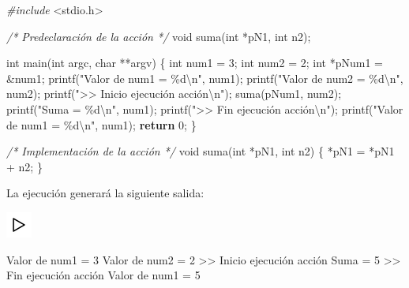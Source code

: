 \documentclass[
]{book}
\newenvironment{Shaded}{\begin{snugshade}}{\end{snugshade}}
\newcommand{\CommentTok}[1]{\textcolor[rgb]{0.56,0.35,0.01}{\textit{#1}}}
\newcommand{\ControlFlowTok}[1]{\textcolor[rgb]{0.13,0.29,0.53}{\textbf{#1}}}
\newcommand{\DataTypeTok}[1]{\textcolor[rgb]{0.13,0.29,0.53}{#1}}
\newcommand{\DecValTok}[1]{\textcolor[rgb]{0.00,0.00,0.81}{#1}}
\newcommand{\ImportTok}[1]{#1}
\newcommand{\NormalTok}[1]{#1}
\newcommand{\PreprocessorTok}[1]{\textcolor[rgb]{0.56,0.35,0.01}{\textit{#1}}}
\newcommand{\SpecialCharTok}[1]{\textcolor[rgb]{0.00,0.00,0.00}{#1}}
\newcommand{\StringTok}[1]{\textcolor[rgb]{0.31,0.60,0.02}{#1}}
\begin{document}
\begin{Shaded}
\begin{Highlighting}[]
\PreprocessorTok{\#include }\ImportTok{\textless{}stdio.h\textgreater{}}

\CommentTok{/* Predeclaración de la acción */}
\DataTypeTok{void}\NormalTok{ suma(}\DataTypeTok{int}\NormalTok{ *pN1, }\DataTypeTok{int}\NormalTok{ n2);}

\DataTypeTok{int}\NormalTok{ main(}\DataTypeTok{int}\NormalTok{ argc, }\DataTypeTok{char}\NormalTok{ **argv) \{}
    \DataTypeTok{int}\NormalTok{ num1 = }\DecValTok{3}\NormalTok{;}
    \DataTypeTok{int}\NormalTok{ num2 = }\DecValTok{2}\NormalTok{;}
    \DataTypeTok{int}\NormalTok{ *pNum1 = \&num1;}
\NormalTok{    printf(}\StringTok{"Valor de num1 = \%d}\SpecialCharTok{\textbackslash{}n}\StringTok{"}\NormalTok{, num1);}
\NormalTok{    printf(}\StringTok{"Valor de num2 = \%d}\SpecialCharTok{\textbackslash{}n}\StringTok{"}\NormalTok{, num2);}
\NormalTok{    printf(}\StringTok{"\textgreater{}\textgreater{} Inicio ejecución acción}\SpecialCharTok{\textbackslash{}n}\StringTok{"}\NormalTok{); }
\NormalTok{    suma(pNum1, num2);}
\NormalTok{    printf(}\StringTok{"Suma = \%d}\SpecialCharTok{\textbackslash{}n}\StringTok{"}\NormalTok{, num1);}
\NormalTok{    printf(}\StringTok{"\textgreater{}\textgreater{} Fin ejecución acción}\SpecialCharTok{\textbackslash{}n}\StringTok{"}\NormalTok{);}
\NormalTok{    printf(}\StringTok{"Valor de num1 = \%d}\SpecialCharTok{\textbackslash{}n}\StringTok{"}\NormalTok{, num1);}
    \ControlFlowTok{return} \DecValTok{0}\NormalTok{;}
\NormalTok{\}}

\CommentTok{/* Implementación de la acción */}
\DataTypeTok{void}\NormalTok{ suma(}\DataTypeTok{int}\NormalTok{ *pN1, }\DataTypeTok{int}\NormalTok{ n2) \{}
\NormalTok{    *pN1 = *pN1 + n2;}
\NormalTok{\}}
\end{Highlighting}
\end{Shaded}

La ejecución generará la siguiente salida:

\includegraphics{./img/play.png}

\begin{Shaded}
\begin{Highlighting}[]
\NormalTok{Valor de num1 = }\DecValTok{3}
\NormalTok{Valor de num2 = }\DecValTok{2}
\NormalTok{\textgreater{}\textgreater{} Inicio ejecución acción}
\NormalTok{Suma = }\DecValTok{5}
\NormalTok{\textgreater{}\textgreater{} Fin ejecución acción}
\NormalTok{Valor de num1 = }\DecValTok{5}
\end{Highlighting}
\end{Shaded}
\end{document}
